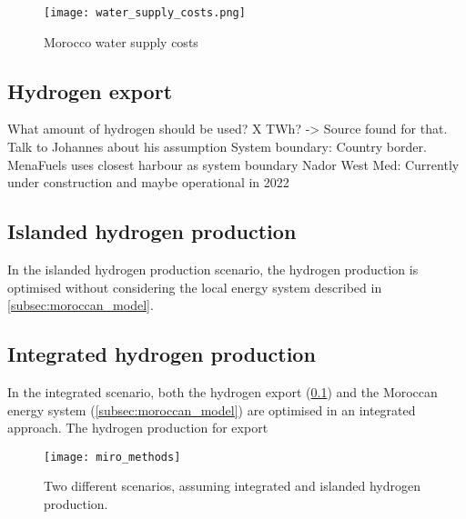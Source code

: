 \begin{figure}[h!]
    \centering
    \texttt{[image: water\_supply\_costs.png]}
    \caption{Morocco water supply costs}
    \label{fig:morocco_water}
\end{figure}


\subsection{Hydrogen export}
\label{subsec:hydrogen_export}
What amount of hydrogen should be used? X TWh? -> Source found for that. Talk to Johannes about his assumption
System boundary: Country border. MenaFuels uses closest harbour as system boundary
Nador West Med: Currently under construction and maybe operational in 2022 \cite{Ersoy2022}



\subsection{Islanded hydrogen production}
In the islanded hydrogen production scenario, the hydrogen production is optimised without considering the local energy system described in \ref{subsec:moroccan_model}.


\subsection{Integrated hydrogen production}
In the integrated scenario, both the hydrogen export (\ref{subsec:hydrogen_export}) and the Moroccan energy system (\ref{subsec:moroccan_model})
are optimised in an integrated approach.
The hydrogen production for export


\begin{figure}[h!]
    \centering
    \texttt{[image: miro\_methods]}
    \caption{Two different scenarios, assuming integrated and islanded hydrogen production.}
    \label{fig:methods_scenarios}
\end{figure}

